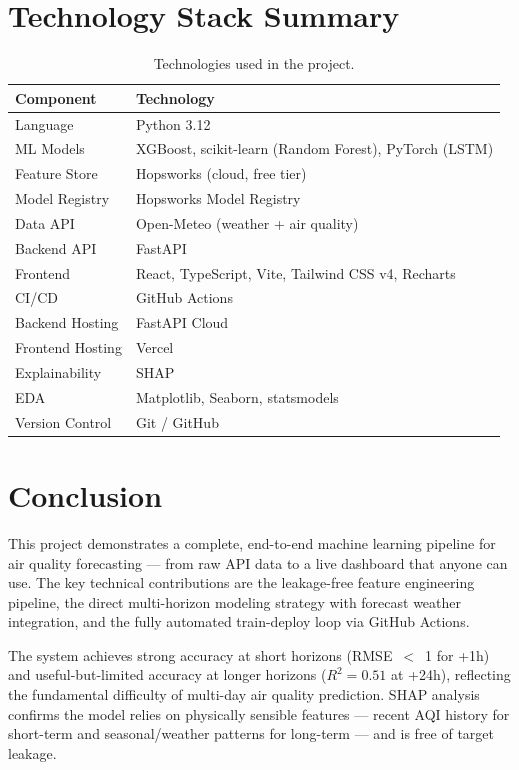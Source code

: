 \documentclass[12pt, a4paper]{article}
\begin{document}
\section{Technology Stack Summary}

\begin{table}[H]
\centering
\caption{Technologies used in the project.}
\begin{tabular}{ll}
\toprule
\textbf{Component} & \textbf{Technology} \\
\midrule
Language            & Python 3.12 \\
ML Models           & XGBoost, scikit-learn (Random Forest), PyTorch (LSTM) \\
Feature Store       & Hopsworks (cloud, free tier) \\
Model Registry      & Hopsworks Model Registry \\
Data API            & Open-Meteo (weather + air quality) \\
Backend API         & FastAPI \\
Frontend            & React, TypeScript, Vite, Tailwind CSS v4, Recharts \\
CI/CD               & GitHub Actions \\
Backend Hosting     & FastAPI Cloud \\
Frontend Hosting    & Vercel \\
Explainability      & SHAP \\
EDA                 & Matplotlib, Seaborn, statsmodels \\
Version Control     & Git / GitHub \\
\bottomrule
\end{tabular}
\end{table}


\section{Conclusion}

This project demonstrates a complete, end-to-end machine learning pipeline for air quality forecasting --- from raw API data to a live dashboard that anyone can use.  The key technical contributions are the leakage-free feature engineering pipeline, the direct multi-horizon modeling strategy with forecast weather integration, and the fully automated train-deploy loop via GitHub Actions.

The system achieves strong accuracy at short horizons (RMSE~$<$~1 for +1h) and useful-but-limited accuracy at longer horizons ($R^2 = 0.51$ at +24h), reflecting the fundamental difficulty of multi-day air quality prediction.  SHAP analysis confirms the model relies on physically sensible features --- recent AQI history for short-term and seasonal/weather patterns for long-term --- and is free of target leakage.
\end{document}
